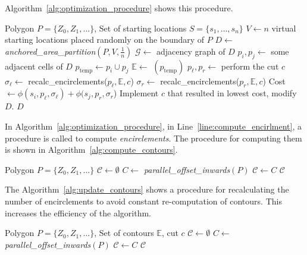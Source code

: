 \documentclass[../main.tex]{subfiles}
\begin{document}
Algorithm~\ref{alg:optimization_procedure} shows this procedure.
\begin{algorithm}
	\small
	\caption{$\operatorname{optimization\_procedure}(P, S)$}
	\label{alg:optimization_procedure}
	\begin{algorithmic}[1]
		\REQUIRE Polygon $P=\{Z_0,Z_1,\ldots\}$, Set of starting locations $S=\{s_1,\ldots,s_n\}$
			\STATE $V\gets n$ virtual starting locations placed randomly on the boundary of $P$ \label{line:1_start_locs}
			\STATE $D\gets$ \textit{anchored\_area\_partition}$(P,V,\frac{1}{n})$
			\STATE $\mathcal{G}\gets$ adjacency graph of $D$
			\REPEAT
				\STATE $p_i,p_j\gets$ some adjacent cells of $D$
				\STATE $p_{\operatorname{temp}}\gets p_i\cup p_j$
				\STATE $\mathbb{E}\gets$ $(p_{\operatorname{temp}})$ \label{line:compute_encirlment}
					\STATE $p_{\ell},p_r\gets$ perform the cut $c$
					\STATE $\sigma_{\ell}\gets$ recalc\_encirclements($p_{\ell},\mathbb{E}, c$) \label{line:recalc_encirclemnts_1}
					\STATE $\sigma_r\gets$ recalc\_encirclements($p_r, \mathbb{E}, c$) \label{line:recalc_encirclemnts_2}
					\STATE Cost $\gets\phi(s_i,p_{\ell},\sigma_{\ell})+\phi(s_j,p_r,\sigma_r$) 
				\ENDFOR
				\STATE Implement $c$ that resulted in lowest cost, modify $D$.
			\RETURN $D$
	\end{algorithmic}
\end{algorithm}

In Algorithm~\ref{alg:optimization_procedure}, in Line~\ref{line:compute_encirlment}, a procedure is called to compute \emph{encirclements}. The procedure for computing them is shown in Algorithm~\ref{alg:compute_contours}.
\begin{algorithm}
	\small
	\caption{$\operatorname{compute\_encirclements}$}
	\label{alg:compute_contours}
	\begin{algorithmic}[1]
		\REQUIRE Polygon $P=\{Z_0,Z_1,\ldots\}$
		\STATE $\mathcal{C}\gets\emptyset$ 
		\REPEAT
			\STATE $C\gets$ \textit{parallel\_offset\_inwards}$(P)$
			\STATE $\mathcal{C}\gets C$
		\RETURN $\mathcal{C}$
	\end{algorithmic}
\end{algorithm}

The Algorithm~\ref{alg:update_contours} shows a procedure for recalculating the number of encirclements to avoid constant re-computation of contours. This increases the efficiency of the algorithm.
\begin{algorithm}
	\small
	\caption{$\operatorname{recalc\_encirclements}$}
	\label{alg:update_contours}
	\begin{algorithmic}[1]
		\REQUIRE Polygon $P=\{Z_0,Z_1,\ldots\}$, Set of contours $\mathbb{E}$, cut $c$
		\STATE $\mathcal{C}\gets\emptyset$ 
		\REPEAT
			\STATE $C\gets$ \textit{parallel\_offset\_inwards}$(P)$
			\STATE $\mathcal{C}\gets C$
		\RETURN $\mathcal{C}$
	\end{algorithmic}
\end{algorithm}
\end{document}
